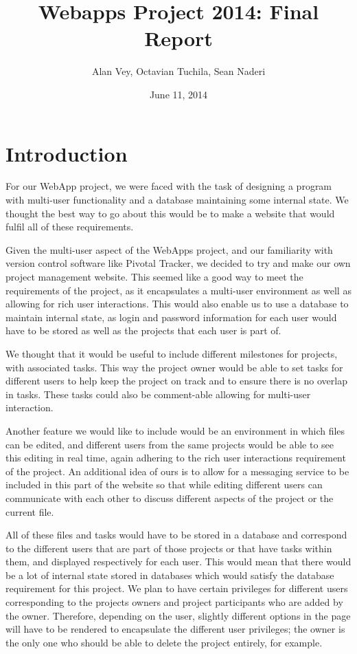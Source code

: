 \documentclass[a4wide, 11pt]{article}
\begin{document}
\title{Webapps Project 2014: Final Report}

\author{Alan Vey, Octavian Tuchila, Sean Naderi}

\date{June 11, 2014}         %

\maketitle            %
\clearpage

\section{Introduction}
For our WebApp project, we were faced with the task of designing a program with multi-user functionality and a database maintaining some internal state. We thought the best way to go about this would be to make a website that would fulfil all of these requirements.

Given the multi-user aspect of the WebApps project, and our familiarity with version control software like Pivotal Tracker, we decided to try and make our own project management website. This seemed like a good way to meet the requirements of the project, as it encapsulates a multi-user environment as well as allowing for rich user interactions. This would also enable us to use a database to maintain internal state, as login and password information for each user would have to be stored as well as the projects that each user is part of. 

We thought that it would be useful to include different milestones for projects, with associated tasks. This way the project owner would be able to set tasks for different users to help keep the project on track and to ensure there is no overlap in tasks. These tasks could also be comment-able allowing for multi-user interaction. 

Another feature we would like to include would be an environment in which files can be edited, and different users from the same projects would be able to see this editing in real time, again adhering to the rich user interactions requirement of the project. An additional idea of ours is to allow for a messaging service to be included in this part of the website so that while editing different users can communicate with each other to discuss different aspects of the project or the current file.

All of these files and tasks would have to be stored in a database and correspond to the different users that are part of those projects or that have tasks within them, and displayed respectively for each user. This would mean that there would be a lot of internal state stored in databases which would satisfy the database requirement for this project. We plan to have certain privileges for different users corresponding to the projects owners and project participants who are added by the owner. Therefore, depending on the user, slightly different options in the page will have to be rendered to encapsulate the different user privileges; the owner is the only one who should be able to delete the project entirely, for example. 
\end{document}

